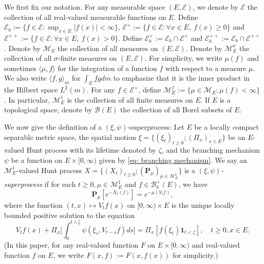 \documentclass[12pt, a4paper]{amsart}
\theoremstyle{definition}
\numberwithin{equation}{section}
\begin{document}
	We first fix our notation.
	For any measurable space $(E,\mathscr E)$, we denote by $\mathscr E$ the collection of all real-valued measurable functions on $E$.
	Define $\mathscr E_b :=\{f \in \mathscr E: \sup_{x\in E}|f(x)|<\infty \}$, $\mathscr E^+ :=\{f\in \mathscr E: \forall x\in E,~f(x)\geq 0\}$ and $\mathscr E^{++} :=\{f\in \mathscr E: \forall x\in E,~f(x)> 0\}$.
	Define $\mathscr E^+_b := \mathscr E_b \cap \mathscr E^+$ and $\mathscr E^{++}_b:= \mathscr E_b \cap \mathscr E^{++}$.
	Denote by $\mathcal M_E$ the collection of all measures on $(E,\mathscr E)$.
	Denote by $\mathcal M^\sigma_E$ the collection of all  $\sigma$-finite measures on $(E,\mathscr E)$.
	For simplicity, we write $\mu(f)$ and sometimes $\langle \mu, f\rangle$ for the integration of a function $f$ with respect to a measure $\mu$.
    We also write $\langle f, g\rangle_m$ for $\int_E fg dm$ to emphasize that it is the inner product in the Hilbert space $L^2(m)$.
	For any $f \in \mathscr E^+$, define $\mathcal M^f_E:= \{\mu \in \mathcal M_E: \mu(f) < \infty\}$.
	In particular, $\mathcal M^1_E$ is the collection of all  finite measures on $E$.
	If $E$ is a topological space, denote by $\mathscr B(E)$ the collection of all  Borel subsets of $E$.
	
	We now give the definition of a $(\xi, \psi)$-superprocess:
	Let $E$ be a locally compact separable metric space, the spatial motion $\xi=\{(\xi_t)_{t\geq 0};(\Pi_x)_{x\in E}\}$ be an $E$-valued Hunt process with its lifetime denoted by $\zeta$, and the branching mechanism $\psi$ be a function on $E\times[0,\infty)$ given by \eqref{eq: branching mechanism}.
	We say an $\mathcal M^1_E$-valued Hunt process $X=\{(X_t)_{t\geq 0}; (\mathbf P_\mu)_{\mu \in \mathcal M^1_E}\}$ is a \emph{$(\xi,\psi)$-superprocess} if for each $t\geq 0, \mu \in \mathcal M_E^1$ and  $f\in \mathscr B^+_b(E)$, we have
\begin{equation}
	\mathbf P_\mu [e^{-X_t(f)}] = e^{-\mu(V_tf)},
\end{equation}
	where the function $(t,x) \mapsto V_tf(x)$ on $[0,\infty) \times E$ is the unique locally bounded positive solution to the equation
\begin{equation}\label{eq:FKPP_in_definition}
	V_t f(x) + \Pi_x \Big[  \int_0^{t\wedge \zeta} \psi (\xi_s,V_{t-s} f) ds \Big]
	= \Pi_x [ f(\xi_t)\mathbf 1_{t<\zeta} ],
	\quad t \geq 0, x \in E.
\end{equation}
	(In this paper, for any real-valued function $F$ on $E\times [0,\infty)$ and real-valued function $f$ on $E$, we write $F(x,f):= F(x,f(x))$ for simplicity.)
\end{document}
